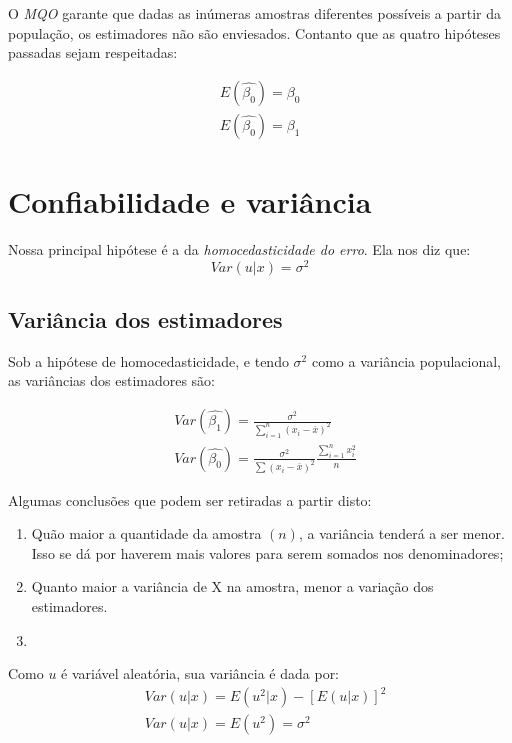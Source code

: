 \documentclass[12pt,a4paper,oneside,brazil]{abntex2}
\begin{document}
O \emph{MQO} garante que dadas as inúmeras amostras diferentes possíveis a partir da população, os estimadores não são enviesados. Contanto que as quatro hipóteses passadas sejam respeitadas:

\begin{align}
    E(\hat{\beta_0}) = \beta_0 \\
    E(\hat{\beta_0}) = \beta_1
\end{align} 

\section{Confiabilidade e variância}

Nossa principal hipótese é a da \emph{homocedasticidade do erro}.
Ela nos diz que:
\begin{equation}
  \label{homocedasticidade}
Var(u|x) = \sigma^2
\end{equation}

\subsection{Variância dos estimadores}

Sob a hipótese de homocedasticidade, e tendo $\sigma^2$ como a variância populacional, as variâncias dos estimadores são:

\begin{align}
&Var(\hat{\beta_1}) = \frac{\sigma^2}{\sum^{n}_{i = 1} (x_i - \overline{x})^2} \\
&Var(\hat{\beta_0}) = \frac{\sigma^2}{\sum (x_i - \overline{x})^2} \frac{\sum^{n}_{i = 1} x_i^2}{n}
\end{align}

Algumas conclusões que podem ser retiradas a partir disto:
\begin{enumerate}
  \item Quão maior a quantidade da amostra $(n)$, a variância tenderá a ser menor. Isso se dá por haverem mais valores para serem somados nos denominadores;
  \item Quanto maior a variância de X na amostra, menor a variação dos estimadores.
  \item 
\end{enumerate}

Como $u$ é variável aleatória, sua variância é dada por:
\begin{align}
&  Var (u|x) = E(u^2|x) - [E(u|x)]^2 \\
&  Var (u|x) = E(u^2) = \sigma^2
\end{align}
\end{document}
